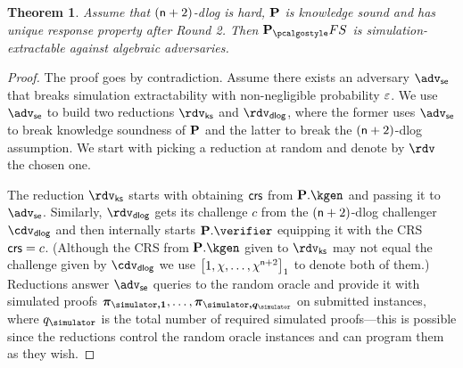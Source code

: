 \documentclass[runningheads,11pt]{llncs}
\let\spvec\vec
\let\vec\accentvec
\let\vec\spvec
\def\vec#1{\mathchoice{\mbox{\boldmath$\displaystyle#1$}}
	{\mbox{\boldmath$\textstyle#1$}}
	{\mbox{\boldmath$\scriptstyle#1$}}
	{\mbox{\boldmath$\scriptscriptstyle#1$}}}
\newtheorem{theorem}{Theorem}%
\theoremstyle{definition}
\begin{document}
\begin{theorem}
	Assume that $(\mathsf{n} + 2)$-dlog is hard, $\mathbf{P}$ is knowledge sound and has unique response property after Round 2. 
	Then $\plonkprotfs$ is simulation-extractable against algebraic adversaries.
\end{theorem}
\begin{proof}
	The proof goes by contradiction. Assume there exists an adversary $\advse$ that breaks simulation extractability with non-negligible probability $\varepsilon$. 
	We use $\advse$ to build two reductions $\rdvks$ and $\rdvdlog$, where the former uses $\advse$ to break knowledge soundness of $\mathbf{P}$ and the latter to break the $(\mathsf{n} + 2)$-dlog assumption.
	We start with picking a reduction at random and denote by $\rdv$ the chosen one.
	
	The reduction $\rdvks$ starts with obtaining $\mathsf{crs}$ from $\plonkprot.\kgen$ and passing it to $\advse$. 
	Similarly, $\rdvdlog$ gets its challenge $c$ from the $(\mathsf{n} + 2)$-dlog challenger $\cdv_\dlog$ and then internally starts $\plonkprot.\verifier$ equipping it with the CRS $\mathsf{crs} = c$. (Although the CRS from $\plonkprot.\kgen$ given to $\rdvks$ may not equal the challenge given by $\cdv_\dlog$ we use $\left[1, \chi, \ldots, \chi^{\mathsf{n} + 2}\right]_{1}$ to denote both of them.)
	Reductions answer $\advse$ queries to the random oracle and provide it with simulated proofs $\vec{\zkproof_{\simulator, 1}}, \ldots, \vec{\zkproof_{\simulator, q_\simulator}}$ on submitted instances, where $q_\simulator$ is the total number of required simulated proofs---this is possible since the reductions control the random oracle instances and can program them as they wish.
	

\end{proof}
\end{document}
